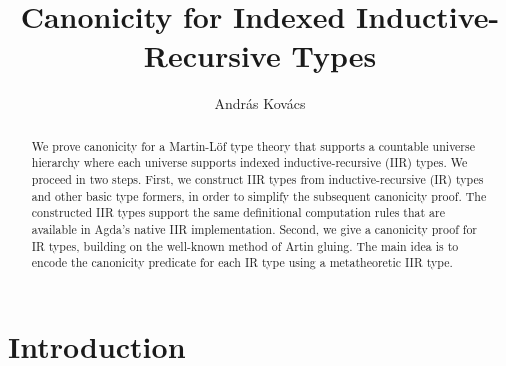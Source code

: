 \documentclass[acmsmall,screen,review,anonymous]{acmart}
\begin{document}
\title{Canonicity for Indexed Inductive-Recursive Types}

\author{András Kovács}


\begin{abstract}
We prove canonicity for a Martin-Löf type theory that supports a countable universe hierarchy where
each universe supports indexed inductive-recursive (IIR) types. We proceed in two steps. First, we
construct IIR types from inductive-recursive (IR) types and other basic type formers, in order to
simplify the subsequent canonicity proof. The constructed IIR types support the same definitional
computation rules that are available in Agda's native IIR implementation. Second, we give a
canonicity proof for IR types, building on the well-known method of Artin gluing. The main idea is
to encode the canonicity predicate for each IR type using a metatheoretic IIR type.
\end{abstract}


\maketitle

\section{Introduction}\label{sec:introduction}
\end{document}

